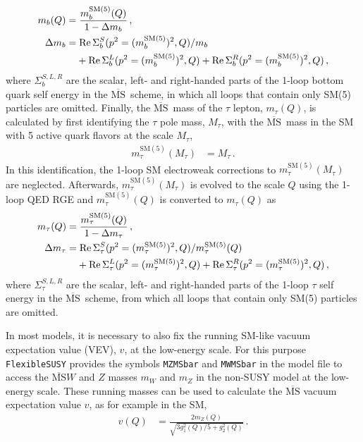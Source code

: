\documentclass[final,3p,11pt,pdflatex]{elsarticle}
\makeatletter
\newcommand{\fs}{\texttt{FlexibleSUSY}\@\xspace}
\newcommand{\code}[1]{\lstinline|#1|}  %
\newcommand{\ol}[1]{\overline{#1}}
\newcommand{\MSbar}{\ensuremath{\ol{\text{MS}}}\xspace}
\newcommand{\SM}{\ensuremath{\text{SM}}\xspace}
\DeclareMathOperator{\re}{Re}
\makeatother
\begin{document}
%
\begin{align}
  m_b(Q) &= \frac{m_b^{\SM(5)}(Q)}{1 - \Delta m_b} \,, \\
  \Delta m_b &= \re\Sigma_{b}^S(p^2=(m_b^{\SM(5)})^2,Q)/m_b \notag\\
  &\phantom{={}}+ \re\Sigma_{b}^L(p^2=(m_b^{\SM(5)})^2,Q)
  + \re\Sigma_{b}^R(p^2=(m_b^{\SM(5)})^2,Q) \,,
  \label{eq:bottom-conversion}
\end{align}
%
where $\Sigma_{b}^{S,L,R}$ are the scalar, left- and right-handed
parts of the 1-loop bottom quark self energy in the \MSbar\ scheme, in
which all loops that contain only SM(5) particles are omitted.  Finally, the
\MSbar\ mass of the $\tau$ lepton, $m_\tau(Q)$, is calculated by first
identifying the $\tau$ pole mass, $M_\tau$, with the \MSbar\ mass in
the SM with 5 active quark flavors at the scale $M_\tau$,
%
\begin{align}
  m_\tau^{\SM(5)}(M_\tau) &=  M_\tau \,.
\end{align}
%
In this identification, the 1-loop SM electroweak
corrections to $m_\tau^{\SM(5)}(M_\tau)$ are neglected.  Afterwards,
$m_\tau^{\SM(5)}(M_\tau)$ is evolved to the scale $Q$ using the 1-loop QED RGE
and $m_\tau^{\SM(5)}(Q)$ is converted to $m_\tau(Q)$ as
%
\begin{align}
  m_\tau(Q) &= \frac{m_\tau^{\SM(5)}(Q)}{1 - \Delta m_\tau} \,, \\
  \Delta m_\tau &=
  \re\Sigma_{\tau}^S(p^2=(m_\tau^{\SM(5)})^2,Q) / m_\tau^{\SM(5)}(Q) \notag \\
  &\phantom{={}}
  + \re\Sigma_{\tau}^L(p^2=(m_\tau^{\SM(5)})^2,Q)
    + \re\Sigma_{\tau}^R(p^2=(m_\tau^{\SM(5)})^2,Q) \,,
\end{align}
%
where $\Sigma_{\tau}^{S,L,R}$ are the scalar, left- and right-handed
parts of the 1-loop $\tau$ self energy in the \MSbar\ scheme,
from which all loops that contain only SM(5) particles are omitted.

In most models, it is necessary to also fix the running SM-like vacuum
expectation value (VEV), $v$, at the low-energy scale.  For this purpose \fs
provides the symbols \code{MZMSbar} and \code{MWMSbar} in the model
file to access the \MSbar $W$ and $Z$ masses $m_W$ and $m_Z$ in the
non-SUSY model at the low-energy scale.  These running masses can be
used to calculate the \MSbar vacuum expectation value $v$, as for
example in the SM,
%
\begin{align}
  v(Q) &= \frac{2 m_Z(Q)}{\sqrt{3 g_1^2(Q) / 5+ g_2^2(Q)}} \,.
\end{align}
\end{document}
